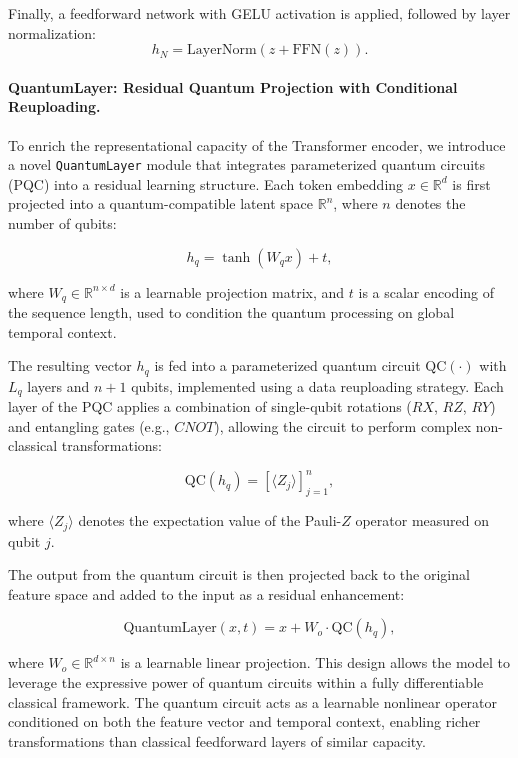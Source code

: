 \documentclass[conference]{IEEEtran}
\begin{document}
Finally, a feedforward network with GELU activation is applied, followed by layer normalization:
\begin{equation}
h_N = \text{LayerNorm}(z + \text{FFN}(z)).
\end{equation}

\paragraph{QuantumLayer: Residual Quantum Projection with Conditional Reuploading.}

To enrich the representational capacity of the Transformer encoder, we introduce a novel \texttt{QuantumLayer} module that integrates parameterized quantum circuits (PQC) into a residual learning structure. Each token embedding $x \in \mathbb{R}^d$ is first projected into a quantum-compatible latent space $\mathbb{R}^n$, where $n$ denotes the number of qubits:

\begin{equation}
h_q = \tanh(W_q x) + t,
\end{equation}

where $W_q \in \mathbb{R}^{n \times d}$ is a learnable projection matrix, and $t$ is a scalar encoding of the sequence length, used to condition the quantum processing on global temporal context.

The resulting vector $h_q$ is fed into a parameterized quantum circuit $\text{QC}(\cdot)$ with $L_q$ layers and $n+1$ qubits, implemented using a data reuploading strategy. Each layer of the PQC applies a combination of single-qubit rotations ($RX$, $RZ$, $RY$) and entangling gates (e.g., $CNOT$), allowing the circuit to perform complex non-classical transformations:

\begin{equation}
\text{QC}(h_q) = \left[ \langle Z_j \rangle \right]_{j=1}^{n},
\end{equation}

where $\langle Z_j \rangle$ denotes the expectation value of the Pauli-$Z$ operator measured on qubit $j$.

The output from the quantum circuit is then projected back to the original feature space and added to the input as a residual enhancement:

\begin{equation}
\text{QuantumLayer}(x, t) = x + W_o \cdot \text{QC}(h_q),
\end{equation}

where $W_o \in \mathbb{R}^{d \times n}$ is a learnable linear projection. This design allows the model to leverage the expressive power of quantum circuits within a fully differentiable classical framework. The quantum circuit acts as a learnable nonlinear operator conditioned on both the feature vector and temporal context, enabling richer transformations than classical feedforward layers of similar capacity.
\end{document}
